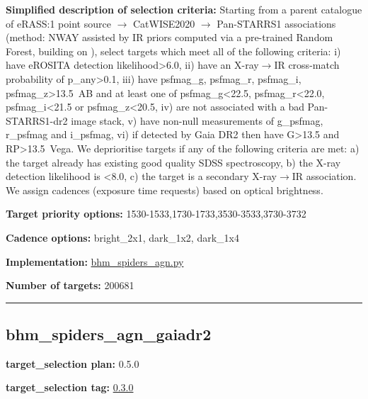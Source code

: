 \noindent\textbf{Simplified description of selection criteria:} Starting from a
parent catalogue of eRASS:1 point source $\rightarrow$ CatWISE2020 $\rightarrow$ Pan-STARRS1
associations (method: NWAY assisted by IR priors computed via a
pre-trained Random Forest, building on
\citealt{Salvato2022}), select targets which meet all of the following criteria:
i) have eROSITA detection likelihood\textgreater{}6.0, ii) have an
X-ray$\rightarrow$IR cross-match probability of p\_any\textgreater{}0.1, iii) have
psfmag\_g, psfmag\_r, psfmag\_i, psfmag\_z\textgreater{}13.5~AB and at
least one of psfmag\_g\textless{}22.5, psfmag\_r\textless{}22.0,
psfmag\_i\textless{}21.5 or psfmag\_z\textless{}20.5, iv) are not
associated with a bad Pan-STARRS1-dr2 image stack, v) have non-null
measurements of g\_psfmag, r\_psfmag and i\_psfmag, vi) if detected by
Gaia DR2 then have G\textgreater{}13.5 and RP\textgreater{}13.5~Vega. We
deprioritise targets if any of the following criteria are met: a) the
target already has existing good quality SDSS spectroscopy, b) the X-ray
detection likelihood is \textless{}8.0, c) the target is a secondary
X-ray$\rightarrow$IR association. We assign cadences (exposure time requests) based
on optical brightness.


\noindent\textbf{Target priority options:}
1530-1533,1730-1733,3530-3533,3730-3732

\noindent\textbf{Cadence options:} bright\_2x1, dark\_1x2, dark\_1x4

\noindent\textbf{Implementation:}
\href{https://github.com/sdss/target_selection/blob/0.3.0/python/target_selection/cartons/bhm_spiders_agn.py}{bhm\_spiders\_agn.py}

\noindent\textbf{Number of targets:} 200681

\begin{center}\rule{0.5\linewidth}{0.5pt}\end{center}

\hypertarget{bhm_spiders_agn_gaiadr2_plan0.5.0}{%
\subsection{bhm\_spiders\_agn\_gaiadr2}\label{bhm_spiders_agn_gaiadr2_plan0.5.0}}

\noindent\textbf{target\_selection plan:} 0.5.0

\noindent\textbf{target\_selection tag:}
\href{https://github.com/sdss/target_selection/tree/0.3.0/}{0.3.0}

